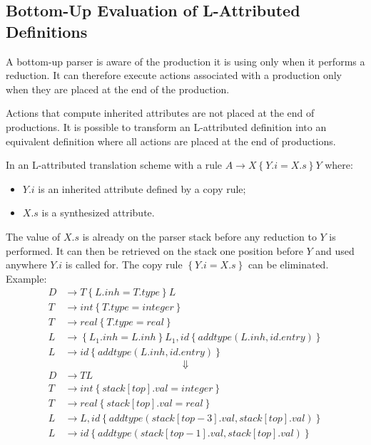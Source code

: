 \subsection{Bottom-Up Evaluation of L-Attributed Definitions}
A bottom-up parser is aware of the production it is using only when it performs a reduction.
It can therefore execute actions associated with a production only when they are placed at the end of the production.

Actions that compute inherited attributes are not placed at the end of productions.
It is possible to transform an L-attributed definition into an equivalent definition where all actions are placed at the end of productions.

In an L-attributed translation scheme with a rule $A \to X\left\{Y.i = X.s\right\}Y$ where:
\begin{itemize}
    \item $Y.i$ is an inherited attribute defined by a copy rule;
    \item $X.s$ is a synthesized attribute.
\end{itemize}
The value of $X.s$ is already on the parser stack before any reduction to $Y$ is performed.
It can then be retrieved on the stack one position before $Y$ and used anywhere $Y.i$ is called for.
The copy rule $\left\{Y.i = X.s\right\}$ can be eliminated.
Example:
\begin{align*}
    D &\to T \left\{L.inh = T.type\right\}L \\
    T &\to int \left\{T.type = integer\right\} \\
    T &\to real \left\{T.type = real\right\} \\
    L &\to \left\{L_1.inh = L.inh\right\}L_1, id\left\{addtype(L.inh, id.entry)\right\} \\
    L &\to id \left\{addtype(L.inh, id.entry)\right\}
\end{align*}
$$
    \Downarrow
$$
\begin{align*}
    D &\to TL \\
    T &\to int \left\{stack[top].val = integer\right\} \\
    T &\to real \left\{stack[top].val = real\right\} \\
    L &\to L, id \left\{addtype(stack[top - 3].val, stack[top].val)\right\} \\
    L &\to id \left\{addtype(stack[top - 1].val, stack[top].val)\right\} 
\end{align*}


